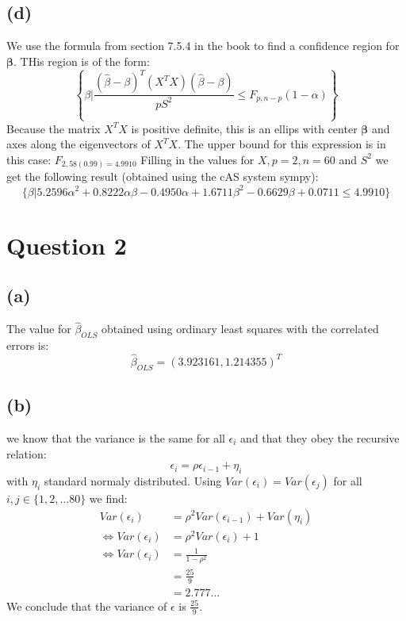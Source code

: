 \documentclass[a4paper]{article}
\begin{document}
\subsection*{(d)}
We use the formula from section 7.5.4 in the book to find a confidence region for $\mathbf{\beta}$. THis region is of the form:
\begin{equation}
	\left\{ \beta \bigg| \frac{(\hat{\beta}-\beta)^T (X^TX) (\hat{\beta}-\beta)}{pS^2} \leq F_{p,n-p}(1-\alpha) \right\}
\end{equation}
Because the matrix $X^TX$ is positive definite, this is an ellips with center $\mathbf{\beta}$ and axes along the eigenvectors of $X^TX$. The upper bound for this expression is in this case: $F_{2,58(0.99) = 4.9910}$ Filling in the values for $X, p=2, n=60$ and $S^2$ we get the following result (obtained using the cAS system sympy):
\begin{equation*}
	\{ \beta | 5.2596 \alpha^{2} + 0.8222 \alpha \beta - 0.4950 \alpha + 1.6711 \beta^{2} - 0.6629 \beta + 0.0711 \leq 4.9910 \}
\end{equation*}


\section*{Question 2}

\subsection*{(a)}
The value for $\hat{\beta}_{OLS}$ obtained using ordinary least squares with the correlated errors is:
\begin{equation}
	\hat{\beta}_{OLS} = (3.923161, 1.214355)^T
\end{equation}

\subsection*{(b)}
we know that the variance is the same for all $\epsilon_i$ and that they obey the recursive relation:
\begin{equation*}
	\epsilon_i = \rho \epsilon_{i-1} + \eta_i
\end{equation*}
with $\eta_i$ standard normaly distributed. Using $Var(\epsilon_i) =Var(\epsilon_j)$ for all $i, j \in \{1, 2, \ldots 80\}$ we find:
\begin{align*}
	Var(\epsilon_i) &= \rho^2 Var(\epsilon_{i-1}) + Var(\eta_i)\\
	\Leftrightarrow Var(\epsilon_i) &= \rho^2 Var(\epsilon_i) + 1\\
	\Leftrightarrow Var(\epsilon_i) &= \frac{1}{1-\rho^2}\\
					&= \frac{25}{9}\\
					&= 2.777 \ldots
\end{align*}
We conclude that the variance of $\epsilon$ is $ \frac{25}{9}$.
\end{document}

